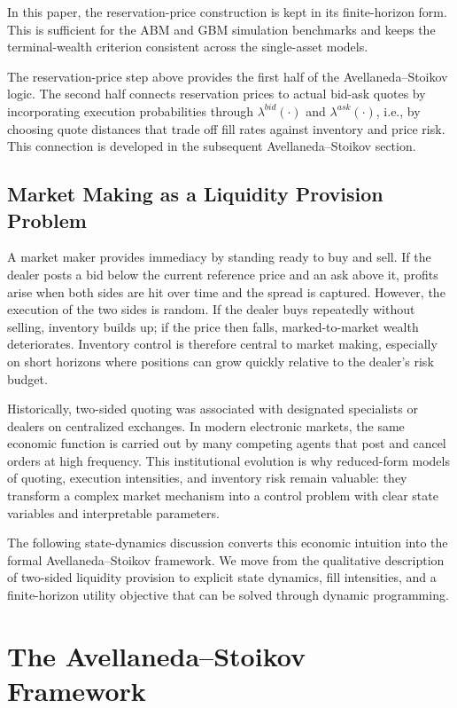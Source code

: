In this paper, the reservation-price construction is kept in its finite-horizon form. This is sufficient for the ABM and GBM simulation benchmarks and keeps the terminal-wealth criterion consistent across the single-asset models.

The reservation-price step above provides the first half of the Avellaneda--Stoikov logic. The second half connects reservation prices to actual bid-ask quotes by incorporating execution probabilities through $\lambda^{bid}(\cdot)$ and $\lambda^{ask}(\cdot)$, i.e., by choosing quote distances that trade off fill rates against inventory and price risk. This connection is developed in the subsequent Avellaneda--Stoikov section.

\subsection{Market Making as a Liquidity Provision Problem}
A market maker provides immediacy by standing ready to buy and sell. If the dealer posts a bid below the current reference price and an ask above it, profits arise when both sides are hit over time and the spread is captured. However, the execution of the two sides is random. If the dealer buys repeatedly without selling, inventory builds up; if the price then falls, marked-to-market wealth deteriorates. Inventory control is therefore central to market making, especially on short horizons where positions can grow quickly relative to the dealer's risk budget.

Historically, two-sided quoting was associated with designated specialists or dealers on centralized exchanges. In modern electronic markets, the same economic function is carried out by many competing agents that post and cancel orders at high frequency. This institutional evolution is why reduced-form models of quoting, execution intensities, and inventory risk remain valuable: they transform a complex market mechanism into a control problem with clear state variables and interpretable parameters.

The following state-dynamics discussion converts this economic intuition into the formal Avellaneda--Stoikov framework. We move from the qualitative description of two-sided liquidity provision to explicit state dynamics, fill intensities, and a finite-horizon utility objective that can be solved through dynamic programming.

\section{The Avellaneda--Stoikov Framework}


